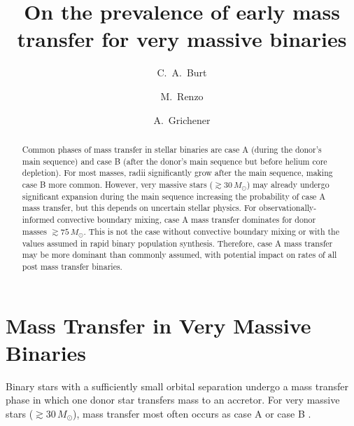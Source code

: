 \documentclass[twocolumn]{aastex63}
\begin{document}
\title{On the prevalence of early mass transfer for very massive binaries}

\author[0009-0008-2061-4946]{C.~A.~Burt}

\author[0000-0002-6718-9472]{M.~Renzo}

\author[0000-0002-2215-1841]{A.~Grichener}

\begin{abstract}
  Common phases of mass transfer in stellar binaries are case A
  (during the donor's main sequence) and case B (after the donor's
  main sequence but before helium core depletion). For most masses,
  radii significantly grow after the main sequence, making case B more
  common. However, very massive stars ($\gtrsim 30\,M_\odot$) may
  already undergo significant expansion during the main sequence
  increasing the probability of case A mass transfer, but this depends
  on uncertain stellar physics. For observationally-informed
  convective boundary mixing, case A mass transfer dominates for donor
  masses $\gtrsim 75 \, M_{\odot}$.  This is not the case without
  convective boundary mixing or with the values assumed in rapid
  binary population synthesis. Therefore, case A mass transfer may be
  more dominant than commonly assumed, with potential impact on rates
  of all post mass transfer binaries.
\end{abstract}

\section{Mass Transfer in Very Massive Binaries}

Binary stars with a sufficiently small orbital separation undergo a
mass transfer phase in which one donor star transfers mass to an
accretor. For very massive stars ($ \gtrsim 30 \, M_{\odot}$), mass
transfer most often occurs as case A or case B \cite{kippenhahn:67}.
\end{document}

